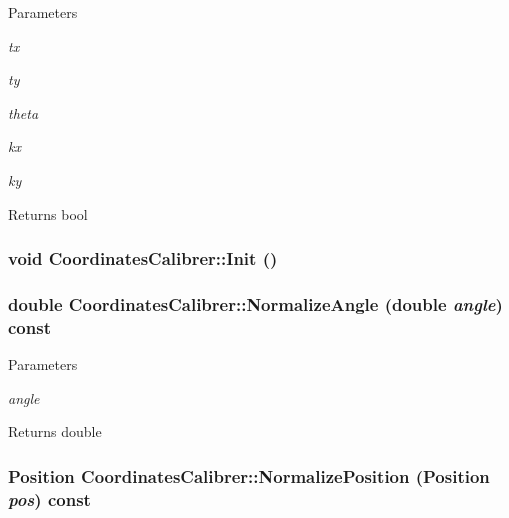 \begin{DoxyParams}{Parameters}
\item[{\em tx}]\item[{\em ty}]\item[{\em theta}]\item[{\em kx}]\item[{\em ky}]\end{DoxyParams}
\begin{DoxyReturn}{Returns}
bool 
\end{DoxyReturn}
\hypertarget{classCoordinatesCalibrer_a19faab9e443f7ef64462a36c19baf6bc}{
\subsubsection[{Init}]{\setlength{\rightskip}{0pt plus 5cm}void CoordinatesCalibrer::Init ()}}
\label{classCoordinatesCalibrer_a19faab9e443f7ef64462a36c19baf6bc}
\hypertarget{classCoordinatesCalibrer_acae6b5f07cf198f9c85a1b09e9a275dc}{
\subsubsection[{NormalizeAngle}]{\setlength{\rightskip}{0pt plus 5cm}double CoordinatesCalibrer::NormalizeAngle (double {\em angle}) const}}
\label{classCoordinatesCalibrer_acae6b5f07cf198f9c85a1b09e9a275dc}

\begin{DoxyParams}{Parameters}
\item[{\em angle}]\end{DoxyParams}
\begin{DoxyReturn}{Returns}
double 
\end{DoxyReturn}
\hypertarget{classCoordinatesCalibrer_ad6519b69842756c256922d14d1e248ce}{
\subsubsection[{NormalizePosition}]{\setlength{\rightskip}{0pt plus 5cm}Position CoordinatesCalibrer::NormalizePosition (Position {\em pos}) const}}
\label{classCoordinatesCalibrer_ad6519b69842756c256922d14d1e248ce}

